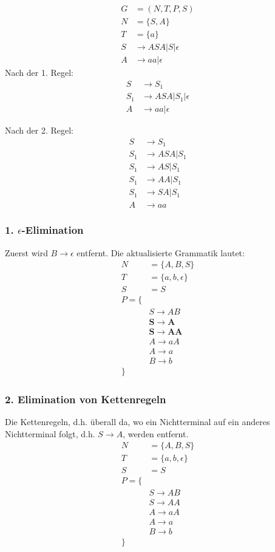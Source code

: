 \documentclass[12pt, oneside]{book}
\begin{document}
\begin{align*}
    G&=(N,T,P,S)\\
    N&=\{S,A\}\\
    T&=\{a\}\\
    S&\to ASA|S|\epsilon\\
    A&\to aa|\epsilon
\end{align*}
Nach der 1. Regel:
\begin{align*}
    S&\to S_1\\
    S_1&\to ASA|S_1|\epsilon\\
    A&\to aa|\epsilon
\end{align*}

Nach der 2. Regel:
\begin{align*}
    S&\to S_1\\
    S_1&\to ASA|S_1\\
    S_1&\to AS|S_1\\
    S_1&\to AA|S_1\\
    S_1&\to SA|S_1\\
    A&\to aa
\end{align*}
\subsubsection{1. $\epsilon$-Elimination}
Zuerst wird $B\to \epsilon$ entfernt. Die aktualisierte Grammatik lautet:
\begin{align*}
    N&=\{A,B,S\}\\
    T&=\{a,b,\epsilon\}\\
    S&=S\\
    P=\{\\
    &S\to AB\\
    &\mathbf{S\to A}\\
    &\mathbf{S\to AA}\\
    &A\to aA\\
    &A\to a\\
    &B\to b\\
    \}
\end{align*}
\subsubsection{2. Elimination von Kettenregeln}
Die Kettenregeln, d.h. überall da, wo ein Nichtterminal auf ein anderes Nichtterminal folgt, d.h. $S\to A$, werden entfernt.
\begin{align*}
    N&=\{A,B,S\}\\
    T&=\{a,b,\epsilon\}\\
    S&=S\\
    P=\{\\
    &S\to AB\\
    &S\to AA\\
    &A\to aA\\
    &A\to a\\
    &B\to b\\
    \}
\end{align*}
\end{document}
